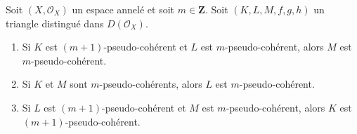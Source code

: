 \begin{lemma}

\label{lemma-cone-pseudo-coherent}

Soit $(X, \mathcal{O}_X)$ un espace annelé et soit $m \in \mathbf{Z}$. Soit $(K, L, M, f, g, h)$ un triangle distingué dans $D(\mathcal{O}_X)$.

\begin{enumerate}

\item Si $K$ est $(m + 1)$-pseudo-cohérent et $L$ est $m$-pseudo-cohérent, alors $M$ est $m$-pseudo-cohérent.
\item Si $K$ et $M$ sont $m$-pseudo-cohérents, alors $L$ est $m$-pseudo-cohérent.
\item Si $L$ est $(m + 1)$-pseudo-cohérent et $M$
est $m$-pseudo-cohérent, alors $K$ est $(m + 1)$-pseudo-cohérent.

\end{enumerate}

\end{lemma}

